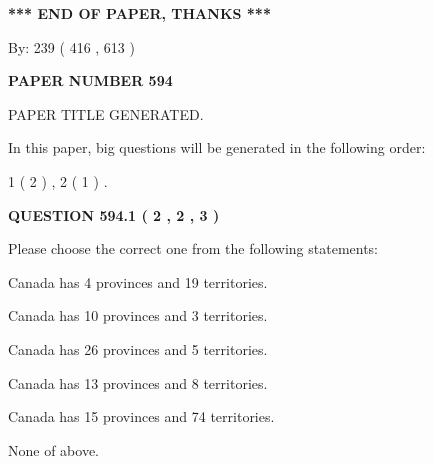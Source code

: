 \documentclass[12pt]{article}
\begin{document}
   
\vspace{1.0in} 
{\textbf{\large{ *** END OF PAPER, THANKS *** }}} 
   
   
\hspace{1.0in} By: 
 239 ( 416 ,  613 )
   
   
   
   
\newpage 
\setcounter{page}{ 
   594001 } 
   
   
   
   
 {\textbf{ \Large{ PAPER NUMBER  594  }}}
   
   
\vspace{0.2in}
   
   
   
   
   
   
   
   
 \vspace{0.2in}
 
 
 
 
   
   
 PAPER TITLE GENERATED.
   
   
   
\vspace{0.2in}
   
In this paper, big questions will be generated in the following order: 
   
   
   1 ( 2 )
 ,
   2 ( 1 )
 .
  
\vspace{0.2in}
  
{\textbf{\Large{QUESTION
594.1 
 ( 2 , 2 , 3 )
}}}
  
  
Please choose the correct one from the following statements:
 
 
Canada has   4 provinces and  19 territories.
 
 
Canada has 10  provinces and 3 territories.
 
 
Canada has  26 provinces and  5 territories.
 
 
Canada has  13 provinces and  8 territories.
 
 
Canada has  15 provinces and  74 territories.
 
 
 None of above.
 
 
\noindent{}
 
\end{document}
